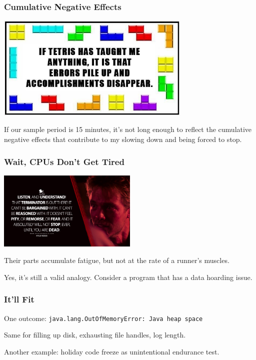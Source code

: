 \begin{frame}
\frametitle{Cumulative Negative Effects}

\begin{center}
  \includegraphics[width=0.7\textwidth]{images/tetris.jpg}
\end{center}

If our sample period is 15 minutes, it's not long enough to reflect the cumulative negative effects that contribute to my slowing down and being forced to stop. 

\end{frame}

\begin{frame}
\frametitle{Wait, CPUs Don't Get Tired}

\begin{center}
  \includegraphics[width=0.5\textwidth]{images/dont-get-tired.jpg}
\end{center}

Their parts accumulate fatigue, but not at the rate of a runner's muscles.

Yes, it's still a valid analogy. Consider a program that has a data hoarding issue.

\end{frame}

\begin{frame}
\frametitle{It'll Fit}

One outcome: \texttt{java.lang.OutOfMemoryError: Java heap space}

Same for filling up disk, exhausting file handles, log length.

Another example: holiday code freeze as unintentional endurance test.

\end{frame}

